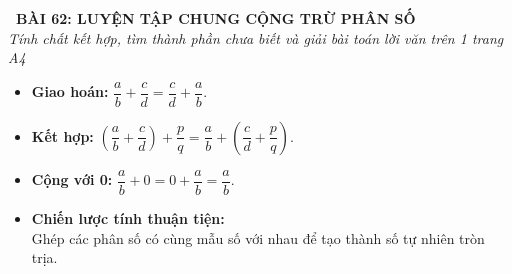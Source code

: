 \documentclass[14pt,a4paper,oneside]{extbook}
\begin{document}
\noindent
\begin{tcolorbox}[
  enhanced,
  colback=teal!8!white,
  colframe=teal!80!black,
  arc=3mm, boxrule=1pt,
  left=3mm, right=3mm, top=2mm, bottom=2mm,
  halign=center
]
  {\Large\bfseries\color{teal!90!black}\faBookmark\ BÀI 62: LUYỆN TẬP CHUNG CỘNG TRỪ PHÂN SỐ}\\[1.5pt]
  {\footnotesize\itshape\color{black!75} Tính chất kết hợp, tìm thành phần chưa biết và giải bài toán lời văn trên 1 trang A4}
\end{tcolorbox}

\vspace{-2.5mm}

\noindent
\begin{minipage}[t]{0.49\textwidth}\vspace{0pt}
\begin{tcolorbox}[
  enhanced,
  colback=blue!4!white,
  colframe=blue!75!black,
  arc=2mm, boxrule=0.8pt,
  left=2mm, right=2mm, top=1.8mm, bottom=1.8mm,
  title={\footnotesize\bfseries\color{white}\faSliders\ 1. Tính chất và tính thuận tiện}
]
{\footnotesize
\begin{itemize}\setlength{\itemsep}{1pt}\setlength{\leftskip}{-2.5mm}
  \item \textbf{Giao hoán:} $\dfrac{a}{b} + \dfrac{c}{d} = \dfrac{c}{d} + \dfrac{a}{b}$.
  \item \textbf{Kết hợp:} $\left(\dfrac{a}{b} + \dfrac{c}{d}\right) + \dfrac{p}{q} = \dfrac{a}{b} + \left(\dfrac{c}{d} + \dfrac{p}{q}\right)$.
  \item \textbf{Cộng với 0:} $\dfrac{a}{b} + 0 = 0 + \dfrac{a}{b} = \dfrac{a}{b}$.
  \item \textbf{Chiến lược tính thuận tiện:}\\
  Ghép các phân số có cùng mẫu số với nhau để tạo thành số tự nhiên tròn trịa.
\end{itemize}
}
\end{tcolorbox}
\end{minipage}
\hfill
\end{document}
